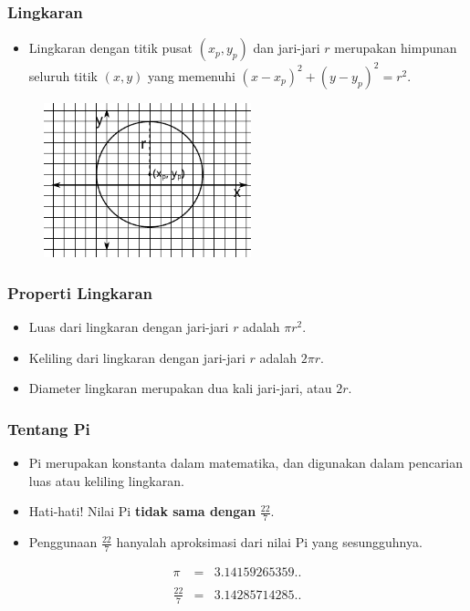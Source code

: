 \begin{frame}
\frametitle{Lingkaran}
\begin{itemize}
  \item Lingkaran dengan titik pusat $(x_p, y_p)$ dan jari-jari $r$ merupakan himpunan seluruh titik $(x, y)$ yang memenuhi $(x - x_p)^2 + (y - y_p)^2 = r^2$.
\end{itemize}
\begin{figure}
  \includegraphics[width=6cm]{asset/circle.pdf}
\end{figure}
\end{frame}

\begin{frame}
\frametitle{Properti Lingkaran}
\begin{itemize}
  \item Luas dari lingkaran dengan jari-jari $r$ adalah $\pi r^2$.
  \item Keliling dari lingkaran dengan jari-jari $r$ adalah $2\pi r$.
  \item Diameter lingkaran merupakan dua kali jari-jari, atau $2r$.
\end{itemize}
\end{frame}

\begin{frame}
\frametitle{Tentang Pi}
\begin{itemize}
  \item Pi merupakan konstanta dalam matematika, dan digunakan dalam pencarian luas atau keliling lingkaran.
  \item Hati-hati! Nilai Pi \textbf{tidak sama dengan} \(\displaystyle \frac{22}{7}\).
  \item Penggunaan \(\displaystyle \frac{22}{7}\) hanyalah aproksimasi dari nilai Pi yang sesungguhnya.
\end{itemize}
\begin{eqnarray*}
\pi &=& 3.14159265359.. \\
\\
\frac{22}{7} &=& 3.14285714285..
\end{eqnarray*}
\end{frame}


